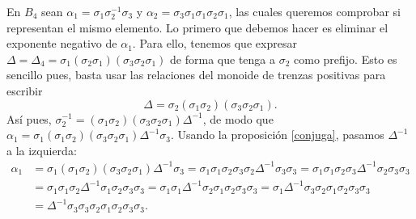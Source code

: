 \documentclass[TFG.tex]{subfiles}
\begin{document}
\begin{ej}
En $B_4$ sean $\alpha_1=\sigma_1\sigma_2^{-1}\sigma_3$ y $\alpha_2=\sigma_3\sigma_1\sigma_1\sigma_2\sigma_1$, las cuales queremos comprobar si representan el mismo elemento. Lo primero que debemos hacer es eliminar el exponente negativo de $\alpha_1$. Para ello, tenemos que expresar $\Delta=\Delta_4=\sigma_1(\sigma_2\sigma_1)(\sigma_3\sigma_2\sigma_1)$ de forma que tenga a $\sigma_2$ como prefijo. Esto es sencillo pues, basta usar las relaciones del monoide de trenzas positivas para escribir
\[
\Delta=\sigma_2(\sigma_1\sigma_2)(\sigma_3\sigma_2\sigma_1).
\]
Así pues, $\sigma_2^{-1}=(\sigma_1\sigma_2)(\sigma_3\sigma_2\sigma_1)\Delta^{-1}$, de modo que $\alpha_1=\sigma_1(\sigma_1\sigma_2)(\sigma_3\sigma_2\sigma_1)\Delta^{-1}\sigma_3$. Usando la proposición \ref{conjuga}, pasamos $\Delta^{-1}$ a la izquierda:
\begin{align*}
\alpha_1&=\sigma_1(\sigma_1\sigma_2)(\sigma_3\sigma_2\sigma_1)\Delta^{-1}\sigma_3=\sigma_1\sigma_1\sigma_2\sigma_3\sigma_2\Delta^{-1}\sigma_3\sigma_3=\sigma_1\sigma_1\sigma_2\sigma_3\Delta^{-1}\sigma_2\sigma_3\sigma_3\\
 & =\sigma_1\sigma_1\sigma_2\Delta^{-1}\sigma_1\sigma_2\sigma_3\sigma_3=\sigma_1\sigma_1\Delta^{-1}\sigma_2\sigma_1\sigma_2\sigma_3\sigma_3=\sigma_1\Delta^{-1}\sigma_3\sigma_2\sigma_1\sigma_2\sigma_3\sigma_3\\
 & =\Delta^{-1}\sigma_3\sigma_3\sigma_2\sigma_1\sigma_2\sigma_3\sigma_3.
\end{align*}


\end{ej}
\end{document}
